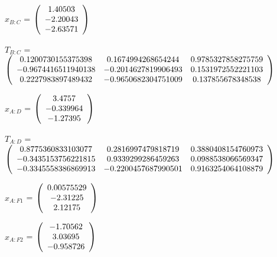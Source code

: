\begin{description}
$x_{B:C}$ = $\left( \begin{array} {ccc}    1.40503 \\   -2.20043 \\   -2.63571 
\end{array} \right)\\ \\$

$T_{B:C}$ = $\left( \begin{array} {ccc} 
   0.1200730155375398 & 0.1674994268654244 & 0.9785327858275759 \\ 
   -0.9674416511940138 & -0.2014627819906493 & 0.1531972552221103 \\ 
   0.2227983897489432 & -0.9650682304751009 & 0.137855678348538 \\
\end{array} \right)\\ \\$

$x_{A:D}$ = $\left( \begin{array} {ccc}     3.4757 \\  -0.339964 \\   -1.27395 
\end{array} \right)\\ \\$

$T_{A:D}$ = $\left( \begin{array} {ccc} 
   0.8775360833103077 & 0.2816997479818719 & 0.3880408154760973 \\ 
   -0.3435153756221815 & 0.9339299286459263 & 0.0988538066569347 \\ 
   -0.3345558386869913 & -0.2200457687990501 & 0.9163254064108879 \\
\end{array} \right)\\ \\$

$x_{A:F1}$ = $\left( \begin{array} {ccc} 0.00575529 \\   -2.31225 \\    2.12175 
\end{array} \right)\\ \\$

$x_{A:F2}$ = $\left( \begin{array} {ccc}   -1.70562 \\    3.03695 \\  -0.958726 
\end{array} \right)\\ \\$


\end{description}
